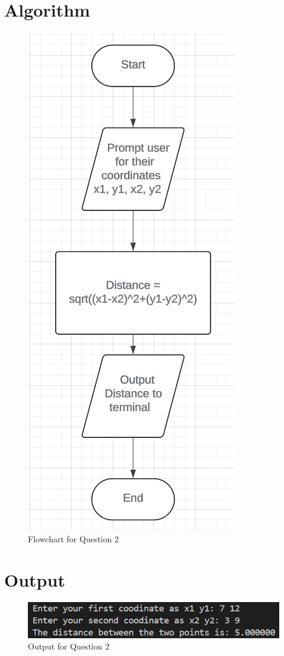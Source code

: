 \documentclass{article}
\begin{document}
\begin{flushleft}
	\section{Algorithm}
	\begin{figure}[!h]
		\begin{centering}
			\includegraphics[scale=0.45]{Q2flowchart.png}
			\caption{Flowchart for Question 2}
		\end{centering}
	\end{figure}
	\section{Output}
	\begin{figure}[!h]
		\begin{centering}
			\includegraphics[width=\linewidth]{Q2Output.png}
			\caption{Output for Question 2}
		\end{centering}
	\end{figure}

\end{flushleft}
\end{document}
